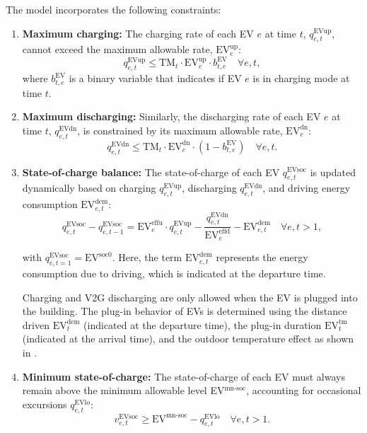 \documentclass[11pt]{article}
\begin{document}
The model incorporates the following constraints:
\begin{enumerate}
    \item \textbf{Maximum charging:}
    The charging rate of each EV \(e\) at time \(t\), \(q^\text{EVup}_{e,t}\), cannot exceed the maximum allowable rate, \(\text{EV}^\text{up}_e\):
    \[
    q^\text{EVup}_{e,t} \leq \text{TM}_t \cdot \text{EV}^\text{up}_e \cdot b^\text{EV}_{t,e}
    \quad
    \forall e,t,
    \]
    where \(b^\text{EV}_{t,e}\) is a binary variable that indicates if EV \(e\) is in charging mode at time \(t\).

    \item \textbf{Maximum discharging:}
    Similarly, the discharging rate of each EV \(e\) at time \(t\), \(q^\text{EVdn}_{e,t}\), is constrained by its maximum allowable rate, \(\text{EV}^\text{dn}_e\):
    \[
    q^\text{EVdn}_{e,t} \leq \text{TM}_t \cdot \text{EV}^\text{dn}_e \cdot (1 - b^\text{EV}_{t,e})
    \quad
    \forall e,t.
    \]

    \item \textbf{State-of-charge balance:}
    The state-of-charge of each EV \(q^\text{EVsoc}_{e,t}\) is updated dynamically based on charging \(q^\text{EVup}_{e,t}\), discharging \(q^\text{EVdn}_{e,t}\), and driving energy consumption \(\text{EV}^\text{dem}_{e,t}\):
    \[
    q^\text{EVsoc}_{e,t} - q^\text{EVsoc}_{e,t-1} =  \text{EV}^\text{effu}_e \cdot q^\text{EVup}_{e,t} 
    - \frac{q^\text{EVdn}_{e,t}}{\text{EV}^\text{effd}_e} - \text{EV}^\text{dem}_{e,t}
    \quad
    \forall e,t>1,
    \]

    with \(q^\text{EVsoc}_{e,t=1} = \text{EV}^\text{soc0}\). Here, the term \(\text{EV}^\text{dem}_{e,t}\) represents the energy consumption due to driving, which is indicated at the departure time.
    
    Charging and V2G discharging are only allowed when the EV is plugged into the building. The plug-in behavior of EVs is determined using the distance driven \(\text{EV}^\text{dem}_t\) (indicated at the departure time), the plug-in duration \(\text{EV}^\text{tm}_t\) (indicated at the arrival time), and the outdoor temperature effect as shown in \cite{yuksel2015temp}.
    
    \item \textbf{Minimum state-of-charge:}
    The state-of-charge of each EV must always remain above the minimum allowable level EV\(^\text{mn-soc}\), accounting for occasional excursions \(q^\text{EVlo}_{e,t}\):
    \[
    v^\text{EVsoc}_{e,t} \geq \text{EV}^\text{mn-soc} - q^\text{EVlo}_{e,t}
    \quad
    \forall e,t>1.
    \]
\end{enumerate}
\end{document}
